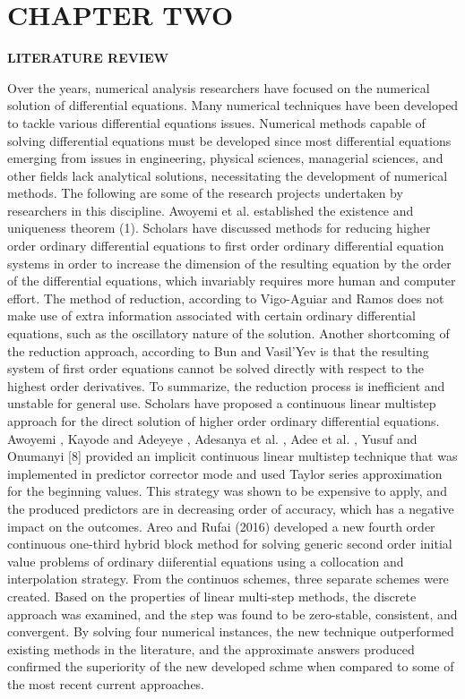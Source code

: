 \documentclass[12pt]{report}
\begin{document}
\chapter[CHAPTER TWO: LITERATURE REVIEW]{CHAPTER TWO}
\begin{center}
	\Large\textbf{LITERATURE REVIEW}
\end{center}
\noindent Over the years, numerical analysis researchers have focused on the numerical solution of differential equations. Many numerical techniques have been developed to tackle various differential equations issues. Numerical methods capable of solving differential equations must be developed since most differential equations emerging from issues in engineering, physical sciences, managerial sciences, and other fields lack analytical solutions, necessitating the development of numerical methods. The following are some of the research projects undertaken by researchers in this discipline.
\noindent Awoyemi et al.\cite{Awoyemi} established the existence and uniqueness theorem (1). Scholars have discussed methods for reducing higher order ordinary differential equations to first order ordinary differential equation systems in order to increase the dimension of the resulting equation by the order of the differential equations, which invariably requires more human and computer effort. The method of reduction, according to Vigo-Aguiar and Ramos \cite{Vigo-Aguiar} does not make use of extra information associated with certain ordinary differential equations, such as the oscillatory nature of the solution. Another shortcoming of the reduction approach, according to Bun and Vasil'Yev \cite{Areo} is that the resulting system of first order equations cannot be solved directly with respect to the highest order derivatives. To summarize, the reduction process is inefficient and unstable for general use.
\noindent Scholars have proposed a continuous linear multistep approach for the direct solution of higher order ordinary differential equations. Awoyemi \cite{Bun}, Kayode and Adeyeye \cite{Awoyem}, Adesanya et al. \cite{Areo}, Adee et al. \cite{fateme}, Yusuf and Onumanyi [8] provided an implicit continuous linear multistep technique that was implemented in predictor corrector mode and used Taylor series approximation for the beginning values. This strategy was shown to be expensive to apply, and the produced predictors are in decreasing order of accuracy, which has a negative impact on the outcomes.
\noindent Areo and Rufai (2016) developed a new fourth order continuous one-third hybrid block method for solving generic second order initial value problems of ordinary diiferential equations using a collocation and interpolation strategy. From the continuos schemes, three separate schemes were created. Based on the properties of linear multi-step methods, the discrete approach was examined, and the step was found to be zero-stable, consistent, and convergent. By solving four numerical instances, the new technique outperformed existing methods in the literature, and the approximate answers produced confirmed the superiority of the new developed schme when compared to some of the most recent current approaches.
\end{document}
